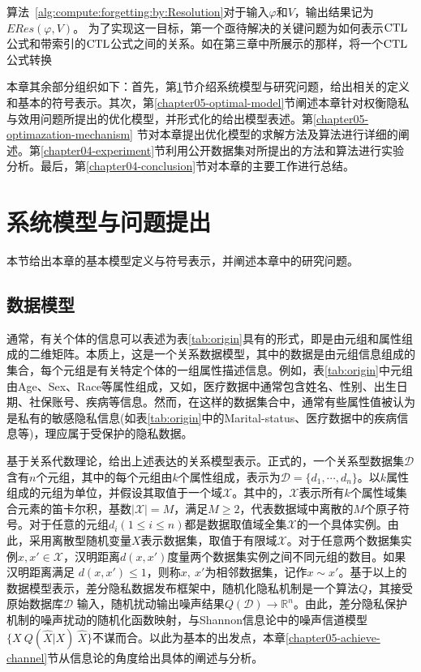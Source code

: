 算法~\ref{alg:compute:forgetting:by:Resolution}对于输入$\varphi$和$V$，输出结果记为$ERes(\varphi, V)$。
为了实现这一目标，第一个亟待解决的关键问题为如何表示$\textrm{CTL}$公式和带索引的$\textrm{CTL}$公式之间的关系。如在第三章中所展示的那样，将一个$\textrm{CTL}$公式转换

本章其余部分组织如下：首先，第\ref{chapter05-system-model}节介绍系统模型与研究问题，给出相关的定义和基本的符号表示。其次，第\ref{chapter05-optimal-model}节阐述本章针对权衡隐私与效用问题所提出的优化模型，并形式化的给出模型表述。第\ref{chapter05-optimazation-mechanism} 节对本章提出优化模型的求解方法及算法进行详细的阐述。第\ref{chapter04-experiment}节利用公开数据集对所提出的方法和算法进行实验分析。最后，第\ref{chapter04-conclusion}节对本章的主要工作进行总结。

\section{系统模型与问题提出}\label{chapter05-system-model}

本节给出本章的基本模型定义与符号表示，并阐述本章中的研究问题。

\subsection{数据模型}
通常，有关个体的信息可以表述为表\ref{tab:origin}具有的形式，即是由元组和属性组成的二维矩阵。本质上，这是一个关系数据模型，其中的数据是由元组信息组成的集合，每个元组是有关特定个体的一组属性描述信息。例如，表\ref{tab:origin}中元组由Age、Sex、Race等属性组成，又如，医疗数据中通常包含姓名、性别、出生日期、社保账号、疾病等信息。然而，在这样的数据集合中，通常有些属性值被认为是私有的敏感隐私信息(如表\ref{tab:origin}中的Marital-status、医疗数据中的疾病信息等)，理应属于受保护的隐私数据。

基于关系代数理论，给出上述表达的关系模型表示。正式的，一个关系型数据集$\mathcal{D}$含有$n$个元组，其中的每个元组由$k$个属性组成，表示为$\mathcal{D}=\{d_1,\cdots,d_n\}$。以$k$属性组成的元组为单位，并假设其取值于一个域$\mathcal{X}$。其中的，$\mathcal{X}$表示所有$k$个属性域集合元素的笛卡尔积，基数$|\mathcal{X}|=M$，满足$M \geq 2$，代表数据域中离散的$M$个原子符号。对于任意的元组$d_i(1\leq i \leq n)$都是数据取值域全集$\mathcal{X}$的一个具体实例。由此，采用离散型随机变量$X$表示数据集，取值于有限域$\mathcal{X}$。对于任意两个数据集实例$x,x' \in \mathcal{X}$，汉明距离$d(x,x')$度量两个数据集实例之间不同元组的数目。如果汉明距离满足 $d(x,x')\leq 1$，则称$x,~x'$为相邻数据集，记作$x\sim x'$。基于以上的数据模型表示，差分隐私数据发布框架中，随机化隐私机制是一个算法$Q$，其接受原始数据库$\mathcal{D}$
输入，随机扰动输出噪声结果$Q(\mathcal{D})\rightarrow \mathbb{R}^{n}$\cite{dwork2014algorithmic}。由此，差分隐私保护机制的噪声扰动的随机化函数映射，与Shannon信息论中的噪声信道模型$\{X~Q(\hat{X}|X)~\hat{X}\}$\cite{xiong2016randomized,alvim2011differential}不谋而合。以此为基本的出发点，本章\ref{chapter05-achieve-channel}节从信息论的角度给出具体的阐述与分析。

